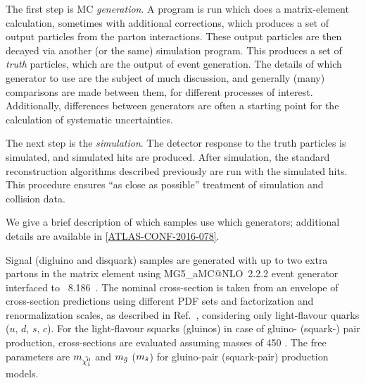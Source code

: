 The first step is MC \textit{generation}.
A program is run which does a matrix-element calculation, sometimes with additional corrections, which produces a set of output particles from the parton interactions.
These output particles are then decayed via another (or the same) simulation program.
This produces a set of \textit{truth} particles, which are the output of event generation.
The details of which generator to use are the subject of much discussion, and generally (many) comparisons are made between them, for different processes of interest.
Additionally, differences between generators are often a starting point for the calculation of systematic uncertainties.

The next step is the \textit{simulation}.
The detector response to the truth particles is simulated, and simulated hits are produced.
After simulation, the standard reconstruction algorithms described previously are run with the simulated hits.
This procedure ensures ``as close as possible'' treatment of simulation and collision data.

We give a brief description of which samples use which generators; additional details are available in \ref{ATLAS-CONF-2016-078}.

Signal (digluino and disquark) samples are generated with up to two extra partons in the matrix element using MG5\_aMC@NLO~2.2.2 event generator~\cite{Alwall:2014hca} interfaced to  \pythia~8.186~\cite{Sjostrand:2014zea}.
The nominal cross-section is taken from an envelope of cross-section predictions using different PDF sets and factorization and renormalization scales, as described in Ref.~\cite{Kramer:2012bx}, considering only light-flavour quarks ($u$, $d$, $s$, $c$).
For the light-flavour squarks (gluinos) in case of gluino- (squark-) pair production, cross-sections are evaluated assuming masses of 450 \TeV.
The free parameters are $m_{\tilde{\chi^0_1}}$ and $m_{\tilde{g}}$ ($m_{\tilde{s}}$) for gluino-pair (squark-pair) production models.

